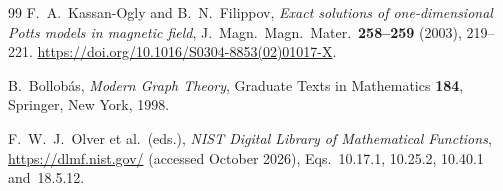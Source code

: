 \documentclass[11pt]{article}
\theoremstyle{definition}
\theoremstyle{remark}
\begin{document}
{\begin{thebibliography}{99}
F.~A.~Kassan-Ogly and B.~N.~Filippov, \emph{Exact solutions of one-dimensional
Potts models in magnetic field}, J.~Magn.~Magn.~Mater.~\textbf{258--259} (2003),
219--221. \url{https://doi.org/10.1016/S0304-8853(02)01017-X}.

B.~Bollob\'as, \emph{Modern Graph Theory}, Graduate Texts in Mathematics
\textbf{184}, Springer, New York, 1998.

F.~W.~J.~Olver et al.\ (eds.), \emph{NIST Digital Library of Mathematical
Functions}, \url{https://dlmf.nist.gov/} (accessed October 2026),
Eqs.~10.17.1, 10.25.2, 10.40.1 and~18.5.12.
\end{thebibliography}
}
\end{document}
